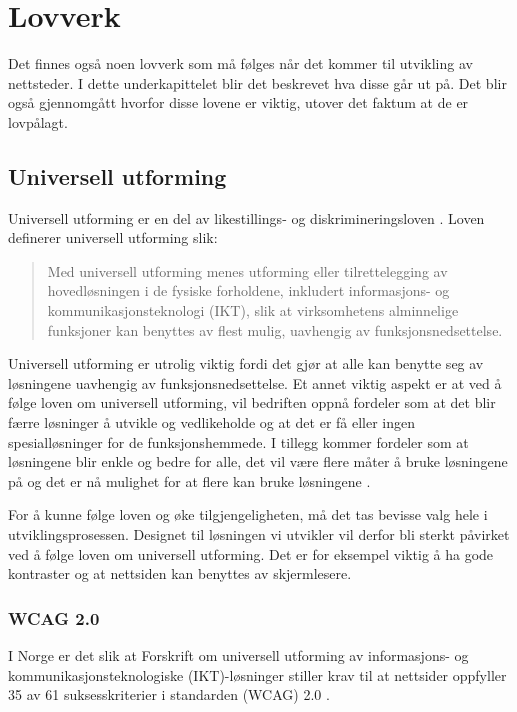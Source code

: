 \section{Lovverk}
Det finnes også noen lovverk som må følges når det kommer til utvikling av nettsteder. I dette underkapittelet blir det beskrevet hva disse går ut på. Det blir også gjennomgått hvorfor disse lovene er viktig, utover det faktum at de er lovpålagt. 

\subsection{Universell utforming}
\label{sec:universal-design}
Universell utforming er en del av likestillings- og diskrimineringsloven \cite{lovdata2018fou}. Loven definerer universell utforming slik:

\begin{quote}
    Med universell utforming menes utforming eller tilrettelegging av hovedløsningen i de fysiske forholdene, inkludert informasjons- og kommunikasjonsteknologi (IKT), slik at virksomhetens alminnelige funksjoner kan benyttes av flest mulig, uavhengig av funksjonsnedsettelse.
\end{quote}

Universell utforming er utrolig viktig fordi det gjør at alle kan benytte seg av løsningene uavhengig av funksjonsnedsettelse. Et annet viktig aspekt er at ved å følge loven om universell utforming, vil bedriften oppnå fordeler som at det blir færre løsninger å utvikle og vedlikeholde og at det er få eller ingen spesialløsninger for de funksjonshemmede. I tillegg kommer fordeler som at løsningene blir enkle og bedre for alle, det vil være flere måter å bruke løsningene på og det er nå mulighet for at flere kan bruke løsningene \cite{difi2018keu}.

For å kunne følge loven og øke tilgjengeligheten, må det tas bevisse valg hele i utviklingsprosessen. Designet til løsningen vi utvikler vil derfor bli sterkt påvirket ved å følge loven om universell utforming. Det er for eksempel viktig å ha gode kontraster og at nettsiden kan benyttes av skjermlesere. 


\subsubsection{WCAG 2.0}

I Norge er det slik at Forskrift om universell utforming av informasjons- og kommunikasjonsteknologiske (IKT)-løsninger \cite{lovdata2013fou} stiller krav til at nettsider oppfyller 35 av 61 suksesskriterier i standarden  (WCAG) 2.0 \cite{difi2018wca}. 

